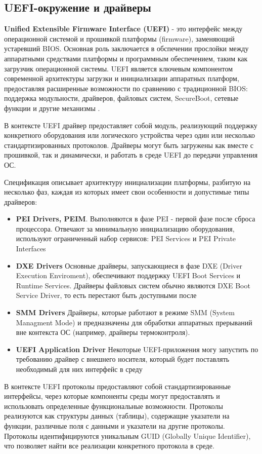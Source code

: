 \subsection{UEFI-окружение и драйверы}
\textbf{Unified Extensible Firmware Interface (UEFI)} - это интерфейс между операционной системой и прошивкой платформы (firmware), заменяющий устаревший BIOS.  Основная роль заключается в обспечении прослойки между аппаратными средствами платформы и программным обеспечением, таким как загрузчик операционной системы. UEFI является ключевым компонентом современной архитектуры загрузки и инициализации аппаратных платформ, предоставляя расширенные возможности по сравнению с традиционной BIOS: поддержка модульности, драйверов, файловых систем, SecureBoot, сетевые функции и другие механизмы \cite{UEFISpec}.

В контексте UEFI драйвер предоставляет собой модуль, реализующий поддержку конкретного оборудования или логического устройства через один или несколько стандартизированных протоколов. Драйверы могут быть загружены как вместе с прошивкой, так и динамически, и работать в среде UEFI до передачи управления ОС.

Спецификация \cite{UEFIPI} описывает архитектуру инициализации платформы, разбитую на несколько фаз, каждая из которых имеет свои особенности и допустимые типы драйверов:
\begin{itemize}
	\item \textbf{PEI Drivers, PEIM}. Выполняются в фазе PEI - первой фазе после сброса процессора. Отвечают за минимальную инициализацию оборудования, используют ограниченный набор сервисов: PEI Services и PEI Private Interfaces
	\item \textbf{DXE Drivers} Основные драйверы, запускающиеся в фазе DXE (Driver Execution Enviroment), обеспечивают поддержку UEFI Boot Services и Runtime Services. Драйверы файловых систем обычно являются DXE Boot Service Driver, то есть перестают быть доступными после 
	\item \textbf{SMM Drivers} Драйверы, которые работают в режиме SMM (System Managment Mode) и предназначены для обработки аппаратных прерываний вне контекста ОС (например, драйверы термоконтроля).
	\item \textbf{UEFI Application Driver} Некоторые UEFI-приложения могу запустить по требованию драйвер с внешнего носителя, который будет поставлять необходимый для них интерфейс в среду
\end{itemize} 

В контексте UEFI протоколы предоставляют собой стандартизированные интерфейсы, через которые компоненты среды могут предоставлять и использовать определенные функциональные возможности. Протоколы реализуются как структуры данных (таблицы), содержащие указатели на функции, различные поля с данными и указатели на другие протоколы. Протоколы идентифицируются уникальным GUID (Globally Unique Identifier), что позволяет найти все реализации конкретного протокола в среде.

